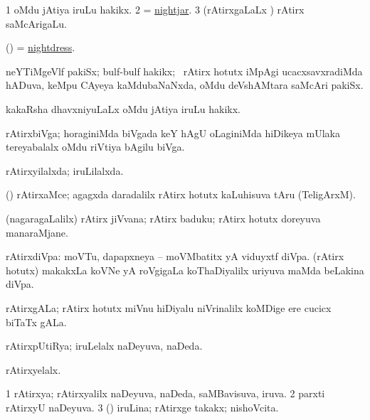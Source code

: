 \bentry
{}
\gl{\nA}
\bmng
\bnum
\num{1} oMdu jAtiya iruLu hakikx. 
\num{2} = \hyperlink{nightjar}{nightjar}. 
\num{3} (rAtirxgaLaLx \mo) rAtirx saMcArigaLu. 
\enum
\emng
\eentry

\bentry
{}
\gl{\nA}
\bmng
(\AmA) = \hyperlink{nightdress}{nightdress}. 
\emng
\eentry

\bentry
{}
\gl{\nA}
\bmng
neYTiMgeVlf pakiSx; bulf-bulf hakikx; \kanmu\ rAtirx hotutx iMpAgi ucacxsavxradiMda hADuva, keMpu CAyeya kaMdubaNaNxda,  oMdu deVshAMtara saMcAri pakiSx.  
\emng
\eentry

\bentry
{}
\gl{\nA}
\bmng
kakaRsha dhavxniyuLaLx oMdu jAtiya iruLu hakikx. 
\emng
\eentry

\bentry
{}
\gl{\nA}
\bmng
rAtirxbiVga; horaginiMda biVgada keY hAgU oLaginiMda hiDikeya mUlaka tereyabalalx oMdu riVtiya bAgilu biVga. 
\emng
\eentry

\bentry
{}
\gl{\gu}
\bmng
rAtirxyilalxda; iruLilalxda. 
\emng
\eentry

\bentry
{}
\gl{\nA}
\bmng
(\ame) rAtirxaMce; agagxda daradalilx rAtirx hotutx kaLuhisuva tAru (TeligArxM). 
\emng
\eentry

\bentry
{}
\gl{\nA}
\bmng
(nagaragaLalilx) rAtirx jiVvana; rAtirx baduku; rAtirx hotutx doreyuva manaraMjane. 
\emng
\eentry

\bentry
{}
\gl{\nA}
\bmng
rAtirxdiVpa: 
\banum
{} moVTu, dapapxneya -- moVMbatitx yA viduyxtf diVpa. 
 (rAtirx hotutx) makakxLa koVNe yA roVgigaLa koThaDiyalilx uriyuva maMda beLakina diVpa. 
\eanum
\emng
\eentry

\bentry
{}
\gl{\nA}
\bmng
rAtirxgALa; rAtirx hotutx miVnu hiDiyalu niVrinalilx koMDige ere cucicx biTaTx gALa. 
\emng
\eentry

\bentry
{}
\gl{\gu}
\bmng
rAtirxpUtiRya; iruLelalx naDeyuva, naDeda. 
\emng
\eentry

\bentry
{}
\gl{\kirxvi}
\bmng
rAtirxyelalx. 
\emng
\eentry

\bentry
{}
\gl{\gu}
\bmng
\bnum
\num{1} rAtirxya; rAtirxyalilx naDeyuva, naDeda, saMBavisuva, iruva. 
\num{2} parxti rAtirxyU naDeyuva. 
\num{3} (\kAparx) iruLina; rAtirxge takakx; nishoVcita. 
\enum
\emng
\eentry

